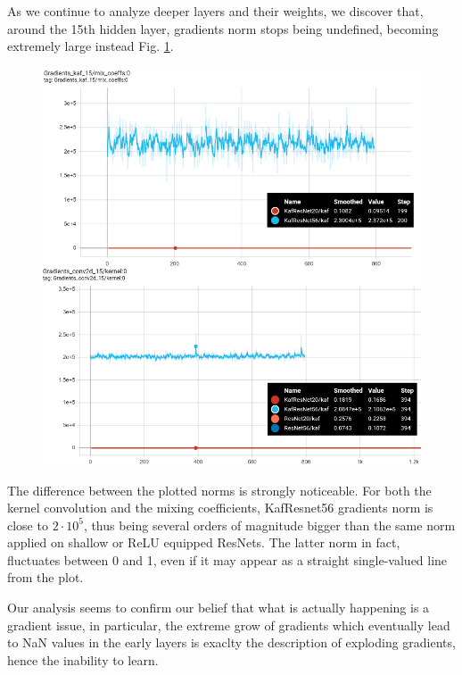 \documentclass[LaM,binding=0.6cm]{./packages/sapthesis/sapthesis}
\begin{document}
        As we continue to analyze deeper layers and their weights, we discover that, around the 15th hidden layer, gradients norm stops being undefined, becoming extremely large instead Fig. \ref{fig:gradkaf15}.
        \begin{figure}[h!]
            \centering
            \includegraphics[scale=0.38]{15grad.png}
            \caption{}
            \label{fig:gradkaf15}
        \end{figure} 
        The difference between the plotted norms is strongly noticeable. For both the kernel convolution and the mixing coefficients, KafResnet56 gradients norm is close to $2 \cdot 10^5$, thus being several orders of magnitude 
        bigger than the same norm applied on shallow or ReLU equipped ResNets. The latter norm in fact, fluctuates between 0 and 1, even if it may appear as a straight single-valued line from the plot.

        Our analysis seems to confirm our belief that what is actually happening is a gradient issue, in particular, the extreme grow of gradients which eventually lead to NaN values in the early layers is exaclty the 
        description of exploding gradients, hence the inability to learn.
        
\end{document}
